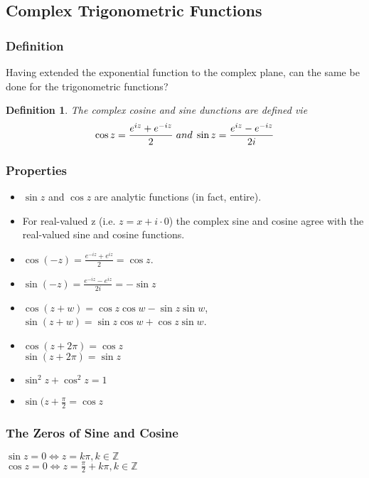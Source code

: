 \documentclass{article}
\newtheorem{definition}{Definition}[section]
\begin{document}
\subsection{Complex Trigonometric Functions}

\subsubsection{Definition}
Having extended the exponential function to the complex plane, can the same be done for the trigonometric functions?
\begin{definition}
The complex cosine and sine dunctions are defined vie
\begin{equation*}
\cos z = \frac{e^{iz} + e^{-iz}}{2} \hspace{0.1cm} and \hspace{0.1cm} \sin z = \frac{e^{iz} - e^{-iz}}{2i}
\end{equation*}
\end{definition}

\subsubsection{Properties}
\begin{itemize}
\item $\sin z$ and $\cos z$ are analytic functions (in fact, entire).
\item For real-valued z (i.e. $z = x + i \cdot 0$) the complex sine and cosine agree with the real-valued sine and cosine functions.
\item $\cos (-z) = \frac{e^{-iz} + e^{iz}}{2} = \cos z$.
\item $\sin (-z) = \frac{e^{-iz} - e^{iz}}{2i} = - \sin z$
\item $\cos (z + w) = \cos z \cos w - \sin z \sin w$, \\
$\sin (z + w) = \sin z \cos w + \cos z \sin w$.
\item $\cos (z + 2\pi) = \cos z$ \\
$\sin (z + 2\pi) = \sin z$
\item $\sin^2z + \cos^2z = 1$
\item $\sin (z + \frac{\pi}{2} = \cos z$
\end{itemize}

\subsubsection{The Zeros of Sine and Cosine}
$\sin z = 0 \iff z = k\pi, k \in \mathbb{Z}$ \\
$\cos z = 0 \iff z = \frac{\pi}{2} + k\pi, k \in \mathbb{Z}$
\end{document}
